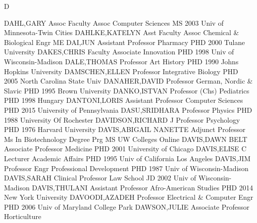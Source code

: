 \documentclass[
]{article}
\begin{document}
D

\textbar{}  \textbar{}

DAHL,GARY \textbar Assoc Faculty Assoc \textbar Computer Sciences
\textbar MS 2003 Univ of Minnesota-Twin Cities \textbar{} 
\textbar DAHLKE,KATELYN \textbar Asst Faculty Assoc \textbar Chemical \&
Biological Engr \textbar ME \textbar{}  \textbar DAI,JUN
\textbar Assistant Professor \textbar Pharmacy \textbar PHD 2000 Tulane
University \textbar{}  \textbar DAKES,CHRIS \textbar Faculty
Associate \textbar Innovation \textbar PHD 1998 Univ of
Wisconsin-Madison \textbar{}  \textbar DALE,THOMAS
\textbar Professor \textbar Art History \textbar PHD 1990 Johns Hopkins
University \textbar{}  \textbar DAMSCHEN,ELLEN
\textbar Professor \textbar Integrative Biology \textbar PHD 2005 North
Carolina State Univ \textbar{}  \textbar DANAHER,DAVID
\textbar Professor \textbar German, Nordic \& Slavic \textbar PHD 1995
Brown University \textbar{}  \textbar DANKO,ISTVAN
\textbar Professor (Chs) \textbar Pediatrics \textbar PHD 1998 Hungary
\textbar{}  \textbar DANTONI,LORIS \textbar Assistant
Professor \textbar Computer Sciences \textbar PHD 2015 University of
Pennsylvania \textbar{}  \textbar DASU,SRIDHARA
\textbar Professor \textbar Physics \textbar PHD 1988 University Of
Rochester \textbar{}  \textbar DAVIDSON,RICHARD J
\textbar Professor \textbar Psychology \textbar PHD 1976 Harvard
University \textbar{}  \textbar DAVIS,ABIGAIL NANETTE
\textbar Adjunct Professor \textbar Ms In Biotechnology Degree Prg
\textbar MS UW Colleges Online \textbar{} 
\textbar DAVIS,DAWN BELT \textbar Associate Professor \textbar Medicine
\textbar PHD 2001 University of Chicago \textbar{} 
\textbar DAVIS,ELISE C \textbar Lecturer \textbar Academic Affairs
\textbar PHD 1995 Univ of California Los Angeles \textbar{} 
\textbar DAVIS,JIM \textbar Professor \textbar Engr Professional
Development \textbar PHD 1987 Univ of Wisconsin-Madison \textbar{}
 \textbar DAVIS,SARAH \textbar Clinical Professor
\textbar Law School \textbar JD 2002 Univ of Wisconsin-Madison
\textbar{}  \textbar DAVIS,THULANI \textbar Assistant
Professor \textbar Afro-American Studies \textbar PHD 2014 New York
University \textbar{}  \textbar DAVOODI,AZADEH
\textbar Professor \textbar Electrical \& Computer Engr \textbar PHD
2006 Univ of Maryland College Park \textbar{} 
\textbar DAWSON,JULIE \textbar Associate Professor \textbar Horticulture
\end{document}
